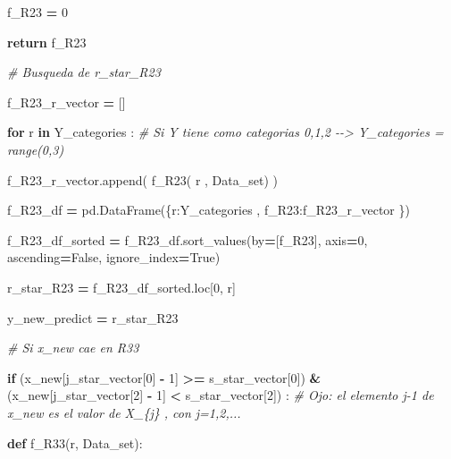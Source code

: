 \documentclass[
  11pt,
  a4paper,
]{article}
\newenvironment{Shaded}{\begin{snugshade}}{\end{snugshade}}
\newcommand{\CommentTok}[1]{\textcolor[rgb]{0.56,0.35,0.01}{\textit{#1}}}
\newcommand{\ControlFlowTok}[1]{\textcolor[rgb]{0.13,0.29,0.53}{\textbf{#1}}}
\newcommand{\DecValTok}[1]{\textcolor[rgb]{0.00,0.00,0.81}{#1}}
\newcommand{\KeywordTok}[1]{\textcolor[rgb]{0.13,0.29,0.53}{\textbf{#1}}}
\newcommand{\NormalTok}[1]{#1}
\newcommand{\OperatorTok}[1]{\textcolor[rgb]{0.81,0.36,0.00}{\textbf{#1}}}
\newcommand{\StringTok}[1]{\textcolor[rgb]{0.31,0.60,0.02}{#1}}
\newcommand{\VariableTok}[1]{\textcolor[rgb]{0.00,0.00,0.00}{#1}}
\begin{document}
\begin{Shaded}
\begin{Highlighting}[]
\NormalTok{                        f\_R23 }\OperatorTok{=} \DecValTok{0}

                    \ControlFlowTok{return}\NormalTok{ f\_R23}

                
            \CommentTok{\# Busqueda de r\_star\_R23}

\NormalTok{                f\_R23\_r\_vector }\OperatorTok{=}\NormalTok{ []}

                \ControlFlowTok{for}\NormalTok{ r }\KeywordTok{in}\NormalTok{ Y\_categories :  }\CommentTok{\# Si Y tiene como categorias 0,1,2 {-}{-}\textgreater{} Y\_categories = range(0,3)}

\NormalTok{                    f\_R23\_r\_vector.append( f\_R23( r , Data\_set) )}

\NormalTok{                f\_R23\_df }\OperatorTok{=}\NormalTok{ pd.DataFrame(\{}\StringTok{\textquotesingle{}r\textquotesingle{}}\NormalTok{:Y\_categories  , }\StringTok{\textquotesingle{}f\_R23\textquotesingle{}}\NormalTok{:f\_R23\_r\_vector \})}
        
\NormalTok{                f\_R23\_df\_sorted }\OperatorTok{=}\NormalTok{ f\_R23\_df.sort\_values(by}\OperatorTok{=}\NormalTok{[}\StringTok{\textquotesingle{}f\_R23\textquotesingle{}}\NormalTok{], axis}\OperatorTok{=}\DecValTok{0}\NormalTok{, ascending}\OperatorTok{=}\VariableTok{False}\NormalTok{, ignore\_index}\OperatorTok{=}\VariableTok{True}\NormalTok{)}

\NormalTok{                r\_star\_R23 }\OperatorTok{=}\NormalTok{ f\_R23\_df\_sorted.loc[}\DecValTok{0}\NormalTok{, }\StringTok{\textquotesingle{}r\textquotesingle{}}\NormalTok{]}


\NormalTok{                y\_new\_predict }\OperatorTok{=}\NormalTok{ r\_star\_R23}



        \CommentTok{\# Si x\_new cae en R33}

            \ControlFlowTok{if}\NormalTok{ (x\_new[j\_star\_vector[}\DecValTok{0}\NormalTok{] }\OperatorTok{{-}} \DecValTok{1}\NormalTok{] }\OperatorTok{\textgreater{}=}\NormalTok{ s\_star\_vector[}\DecValTok{0}\NormalTok{]) }\OperatorTok{\&}\NormalTok{ (x\_new[j\_star\_vector[}\DecValTok{2}\NormalTok{] }\OperatorTok{{-}} \DecValTok{1}\NormalTok{] }\OperatorTok{\textless{}}\NormalTok{ s\_star\_vector[}\DecValTok{2}\NormalTok{]) :  }\CommentTok{\# Ojo: el elemento j{-}1 de x\_new es el valor de X\_\{j\} , con j=1,2,...}

                \KeywordTok{def}\NormalTok{ f\_R33(r, Data\_set):}


\end{Highlighting}
\end{Shaded}
\end{document}
